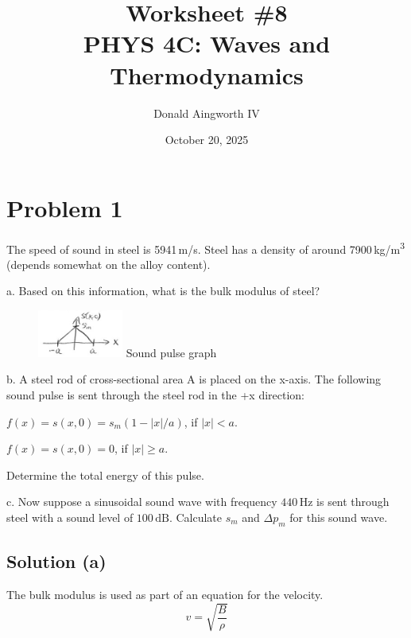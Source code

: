 \documentclass[12pt]{article}
\title{
    Worksheet \#8
    \\  \small
    PHYS 4C: Waves and Thermodynamics
    }
\author{Donald Aingworth IV}
\date{October 20, 2025}
\begin{document}

    \maketitle

    \setcounter{section}{0}
    \section{Problem 1}
        The speed of sound in steel is 5941\,\unit{\meter/\second}.
        Steel has a density of around 7900\,\unit{\kilo\gram/\meter^3} (depends somewhat on the alloy content).
        
        a. Based on this information, what is the bulk modulus of steel?

        \begin{figure}
            \includegraphics[width=0.25\textwidth]{4c-wspic-1617B.jpg} 
        Sound pulse graph
        \end{figure}
        b. A steel rod of cross-sectional area A is placed on the x-axis.  
        The following sound pulse is sent through the steel rod in the +x direction:
        
        $f(x) = s(x,0) = s_m(1 - |x|/a)$, if $|x| < a$.
        
        $f(x) = s(x,0) = 0$, if $|x| \geq a$.

        
        Determine the total energy of this pulse.
        
        c. Now suppose a sinusoidal sound wave with frequency $440\,\unit{\hertz}$ is sent through steel with a sound level of $100\,\unit{\deci\bel}$.  
        Calculate $s_m$ and $\Delta p_m$ for this sound wave.

        \subsection{Solution (a)}
            The bulk modulus is used as part of an equation for the velocity.
            \begin{equation}
                v   =   \sqrt{\frac{B}{\rho}}
            \end{equation}
\end{document}
